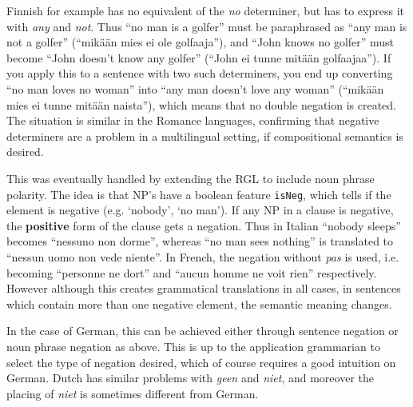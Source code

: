 \documentclass[a4paper]{article}
\begin{document}
Finnish for example has no equivalent of the \emph{no} determiner, but
has to express it with \emph{any} and \emph{not}.  Thus ``no
man is a golfer'' must be paraphrased as ``any man is not a golfer''
(``mikään mies ei ole golfaaja''), and ``John knows no golfer'' must
become ``John doesn't know any golfer'' (``John ei tunne mitään
golfaajaa'').  If you apply this to a sentence with two such
determiners, you end up converting ``no man loves no woman'' into
``any man doesn't love any woman'' (``mikään mies ei tunne mitään
naista''), which means that no double negation is created.
The situation is similar in the Romance languages,
confirming that negative determiners are a problem in a multilingual
setting, if compositional semantics is desired.

This was eventually handled by extending the RGL to include noun
phrase polarity.  The idea is that NP's have a boolean feature
\verb|isNeg|, which tells if the element is negative (e.g. `nobody', `no
man'). If any NP in a clause is negative, the \textbf{positive} form of
the clause gets a negation. Thus in Italian ``nobody sleeps'' becomes
``nessuno non dorme'', whereas ``no man sees nothing'' is translated
to ``nessun uomo non vede niente''.  In French, the negation without
\emph{pas} is used, i.e. becoming ``personne ne dort'' and ``aucun
homme ne voit rien'' respectively.
However although this creates grammatical translations in all cases,
in sentences which contain more than one negative element, the
semantic meaning changes.

In the case of German, this can be achieved either through sentence
negation or noun phrase negation as above.
This is up to the application grammarian to select the type of
negation desired, which of course requires a good intuition on German.
Dutch has similar problems with \emph{geen} and \emph{niet}, and
moreover the placing of \emph{niet} is sometimes different from
German.
\end{document}

